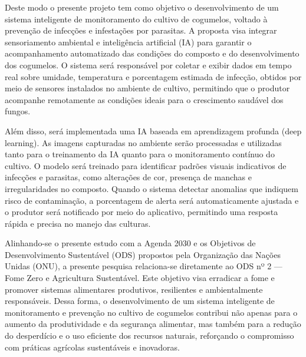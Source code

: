 Deste modo o presente projeto tem como objetivo o desenvolvimento de um sistema inteligente de monitoramento do cultivo de cogumelos, voltado à prevenção de infecções e infestações por parasitas. A proposta visa integrar sensoriamento ambiental e inteligência artificial (IA) para garantir o acompanhamento automatizado das condições do composto e do desenvolvimento dos cogumelos. O sistema será responsável por coletar e exibir dados em tempo real sobre umidade, temperatura e porcentagem estimada de infecção, obtidos por meio de sensores instalados no ambiente de cultivo, permitindo que o produtor acompanhe remotamente as condições ideais para o crescimento saudável dos fungos.

Além disso, será implementada uma IA baseada em aprendizagem profunda (deep learning). As imagens capturadas no ambiente serão processadas e utilizadas tanto para o treinamento da IA quanto para o monitoramento contínuo do cultivo. O modelo será treinado para identificar padrões visuais indicativos de infecções e parasitas, como alterações de cor, presença de manchas e irregularidades no composto. Quando o sistema detectar anomalias que indiquem risco de contaminação, a porcentagem de alerta será automaticamente ajustada e o produtor será notificado por meio do aplicativo, permitindo uma resposta rápida e precisa no manejo das culturas. 

Alinhando-se o presente estudo com a Agenda 2030 e os Objetivos de Desenvolvimento Sustentável (ODS) propostos pela Organização das Nações Unidas (ONU), a presente pesquisa relaciona-se diretamente ao ODS nº 2 — Fome Zero e Agricultura Sustentável. Este objetivo visa erradicar a fome e promover sistemas alimentares produtivos, resilientes e ambientalmente responsáveis. Dessa forma, o desenvolvimento de um sistema inteligente de monitoramento e prevenção no cultivo de cogumelos contribui não apenas para o aumento da produtividade e da segurança alimentar, mas também para a redução do desperdício e o uso eficiente dos recursos naturais, reforçando o compromisso com práticas agrícolas sustentáveis e inovadoras.
